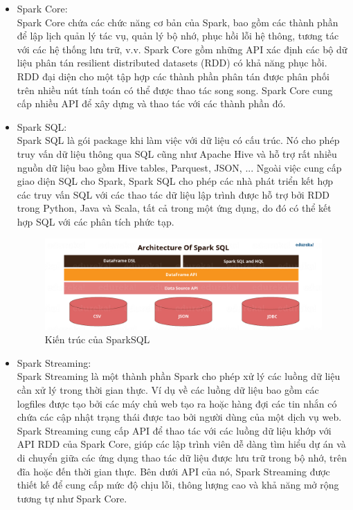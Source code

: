 \documentclass[11pt,a4paper]{article}
\begin{document}
\begin{itemize}
    \item Spark Core: \\
    Spark Core chứa các chức năng cơ bản của Spark, bao gồm các thành phần để lập lịch quản lý tác vụ, quản lý bộ nhớ, phục hồi lỗi hệ thông, tương tác với các hệ thống lưu trữ, v.v. Spark Core gồm những API xác định các bộ dữ liệu phân tán resilient distributed datasets (RDD) có khả năng phục hồi. RDD đại diện cho một tập hợp các thành phần phân tán được phân phối trên nhiều nút tính toán có thể được thao tác song song. Spark Core cung cấp nhiều API để xây dựng và thao tác với các thành phần đó.
    \item Spark SQL: \\
    Spark SQL là gói package khi làm việc với dữ liệu có cấu trúc. Nó cho phép truy vấn dữ liệu thông qua SQL cũng như Apache Hive và hỗ trợ rất nhiều nguồn dữ liệu bao gồm Hive tables, Parquest, JSON, ... Ngoài việc cung cấp giao diện SQL cho Spark, Spark SQL cho phép các nhà phát triển kết hợp các truy vấn SQL với các thao tác dữ liệu lập trình được hỗ trợ bởi RDD trong Python, Java và Scala, tất cả trong một ứng dụng, do đó có thể kết hợp SQL với các phân tích phức tạp.
    \begin{figure}
        \centering
        \includegraphics[width=16cm]{fig/spark_sql_component.png}
        \caption{Kiến trúc của SparkSQL\cite{spark_sql}}
        \label{fig:spark_architecture}
    \end{figure}
    \item Spark Streaming:\\
    Spark Streaming là một thành phần Spark cho phép xử lý các luồng dữ liệu cần xử lý trong thời gian thực. Ví dụ về các luồng dữ liệu bao gồm các logfiles được tạo bởi các máy chủ web tạo ra hoặc hàng đợi các tin nhắn có chứa các cập nhật trạng thái được tao bởi người dùng của một dịch vụ web. Spark Streaming cung cấp API để thao tác với các luồng dữ liệu khớp với API RDD của Spark Core, giúp các lập trình viên dễ dàng tìm hiểu dự án và di chuyển giữa các ứng dụng thao tác dữ liệu được lưu trữ trong bộ nhớ, trên đĩa hoặc đến thời gian thực. Bên dưới API của nó, Spark Streaming được thiết kế để cung cấp mức độ chịu lỗi, thông lượng cao và khả năng mở rộng tương tự như Spark Core.

\end{itemize}
\end{document}
